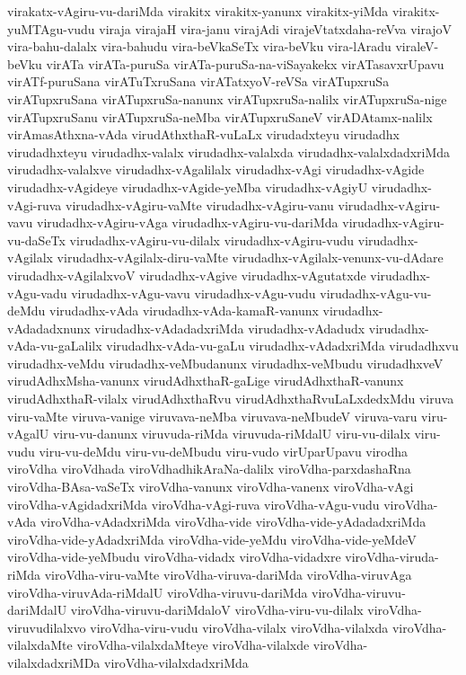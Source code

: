{virakatx-vAgiru-vu-dariMda
virakitx
virakitx-yanunx
virakitx-yiMda
virakitx-yuMTAgu-vudu
viraja
virajaH
vira-janu
virajAdi
virajeVtatxdaha-reVva
virajoV
vira-bahu-dalalx
vira-bahudu
vira-beVkaSeTx
vira-beVku
vira-lAradu
viraleV-beVku
virATa
virATa-puruSa
virATa-puruSa-na-viSayakekx
virATasavxrUpavu
virATf-puruSana
virATuTxruSana
virATatxyoV-reVSa
virATupxruSa
virATupxruSana
virATupxruSa-nanunx
virATupxruSa-nalilx
virATupxruSa-nige
virATupxruSanu
virATupxruSa-neMba
virATupxruSaneV
virADAtamx-nalilx
virAmasAthxna-vAda
virudAthxthaR-vuLaLx
virudadxteyu
virudadhx
virudadhxteyu
virudadhx-valalx
virudadhx-valalxda
virudadhx-valalxdadxriMda
virudadhx-valalxve
virudadhx-vAgalilalx
virudadhx-vAgi
virudadhx-vAgide
virudadhx-vAgideye
virudadhx-vAgide-yeMba
virudadhx-vAgiyU
virudadhx-vAgi-ruva
virudadhx-vAgiru-vaMte
virudadhx-vAgiru-vanu
virudadhx-vAgiru-vavu
virudadhx-vAgiru-vAga
virudadhx-vAgiru-vu-dariMda
virudadhx-vAgiru-vu-daSeTx
virudadhx-vAgiru-vu-dilalx
virudadhx-vAgiru-vudu
virudadhx-vAgilalx
virudadhx-vAgilalx-diru-vaMte
virudadhx-vAgilalx-venunx-vu-dAdare
virudadhx-vAgilalxvoV
virudadhx-vAgive
virudadhx-vAgutatxde
virudadhx-vAgu-vadu
virudadhx-vAgu-vavu
virudadhx-vAgu-vudu
virudadhx-vAgu-vu-deMdu
virudadhx-vAda
virudadhx-vAda-kamaR-vanunx
virudadhx-vAdadadxnunx
virudadhx-vAdadadxriMda
virudadhx-vAdadudx
virudadhx-vAda-vu-gaLalilx
virudadhx-vAda-vu-gaLu
virudadhx-vAdadxriMda
virudadhxvu
virudadhx-veMdu
virudadhx-veMbudanunx
virudadhx-veMbudu
virudadhxveV
virudAdhxMsha-vanunx
virudAdhxthaR-gaLige
virudAdhxthaR-vanunx
virudAdhxthaR-vilalx
virudAdhxthaRvu
virudAdhxthaRvuLaLxdedxMdu
viruva
viru-vaMte
viruva-vanige
viruvava-neMba
viruvava-neMbudeV
viruva-varu
viru-vAgalU
viru-vu-danunx
viruvuda-riMda
viruvuda-riMdalU
viru-vu-dilalx
viru-vudu
viru-vu-deMdu
viru-vu-deMbudu
viru-vudo
virUparUpavu
virodha
viroVdha
viroVdhada
viroVdhadhikAraNa-dalilx
viroVdha-parxdashaRna
viroVdha-BAsa-vaSeTx
viroVdha-vanunx
viroVdha-vanenx
viroVdha-vAgi
viroVdha-vAgidadxriMda
viroVdha-vAgi-ruva
viroVdha-vAgu-vudu
viroVdha-vAda
viroVdha-vAdadxriMda
viroVdha-vide
viroVdha-vide-yAdadadxriMda
viroVdha-vide-yAdadxriMda
viroVdha-vide-yeMdu
viroVdha-vide-yeMdeV
viroVdha-vide-yeMbudu
viroVdha-vidadx
viroVdha-vidadxre
viroVdha-viruda-riMda
viroVdha-viru-vaMte
viroVdha-viruva-dariMda
viroVdha-viruvAga
viroVdha-viruvAda-riMdalU
viroVdha-viruvu-dariMda
viroVdha-viruvu-dariMdalU
viroVdha-viruvu-dariMdaloV
viroVdha-viru-vu-dilalx
viroVdha-viruvudilalxvo
viroVdha-viru-vudu
viroVdha-vilalx
viroVdha-vilalxda
viroVdha-vilalxdaMte
viroVdha-vilalxdaMteye
viroVdha-vilalxde
viroVdha-vilalxdadxriMDa
viroVdha-vilalxdadxriMda
}
